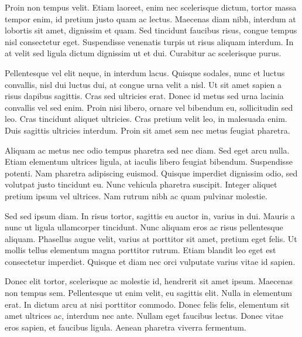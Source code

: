 \documentclass{emulateapj}
\begin{document}
Proin non tempus velit. Etiam laoreet, enim nec scelerisque dictum, tortor massa tempor enim, id pretium justo quam ac lectus. Maecenas diam nibh, interdum at lobortis sit amet, dignissim et quam. Sed tincidunt faucibus risus, congue tempus nisl consectetur eget. Suspendisse venenatis turpis ut risus aliquam interdum. In at velit sed ligula dictum dignissim ut et dui. Curabitur ac scelerisque purus.

Pellentesque vel elit neque, in interdum lacus. Quisque sodales, nunc et luctus convallis, nisl dui luctus dui, at congue urna velit a nisl. Ut sit amet sapien a risus dapibus sagittis. Cras sed ultricies erat. Donec id metus sed urna lacinia convallis vel sed enim. Proin nisi libero, ornare vel bibendum eu, sollicitudin sed leo. Cras tincidunt aliquet ultricies. Cras pretium velit leo, in malesuada enim. Duis sagittis ultricies interdum. Proin sit amet sem nec metus feugiat pharetra.

Aliquam ac metus nec odio tempus pharetra sed nec diam. Sed eget arcu nulla. Etiam elementum ultrices ligula, at iaculis libero feugiat bibendum. Suspendisse potenti. Nam pharetra adipiscing euismod. Quisque imperdiet dignissim odio, sed volutpat justo tincidunt eu. Nunc vehicula pharetra suscipit. Integer aliquet pretium ipsum vel ultrices. Nam rutrum nibh ac quam pulvinar molestie.

Sed sed ipsum diam. In risus tortor, sagittis eu auctor in, varius in dui. Mauris a nunc ut ligula ullamcorper tincidunt. Nunc aliquam eros ac risus pellentesque aliquam. Phasellus augue velit, varius at porttitor sit amet, pretium eget felis. Ut mollis tellus elementum magna porttitor rutrum. Etiam blandit leo eget est consectetur imperdiet. Quisque et diam nec orci vulputate varius vitae id sapien.

Donec elit tortor, scelerisque ac molestie id, hendrerit sit amet ipsum. Maecenas non tempus sem. Pellentesque ut enim velit, eu sagittis elit. Nulla in elementum erat. In dictum arcu at nisi porttitor commodo. Donec felis felis, elementum sit amet ultrices ac, interdum nec ante. Nullam eget faucibus lectus. Donec vitae eros sapien, et faucibus ligula. Aenean pharetra viverra fermentum.
    



\end{document}
